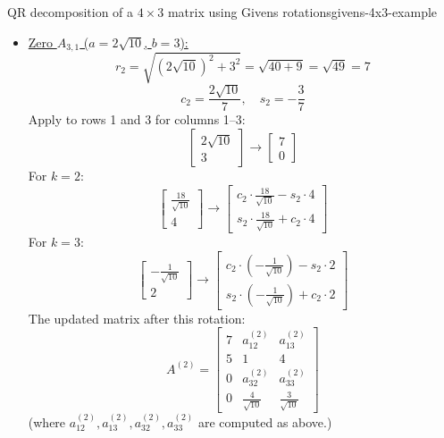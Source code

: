 \begin{example}{QR decomposition of a $4\times3$ matrix using Givens rotations}{givens-4x3-example}
\begin{itemize}
        \item \underline{Zero $A_{3,1}$ ($a=2\sqrt{10}$, $b=3$):}
        \[
            r_2 = \sqrt{(2\sqrt{10})^2 + 3^2} = \sqrt{40 + 9} = \sqrt{49} = 7
        \]
        \[
            c_2 = \frac{2\sqrt{10}}{7}, \quad s_2 = -\frac{3}{7}
        \]
        Apply to rows 1 and 3 for columns 1--3:
        \[
            \begin{bmatrix}
                2\sqrt{10} \\
                3
            \end{bmatrix}
            \to
            \begin{bmatrix}
                7 \\
                0
            \end{bmatrix}
        \]
        For $k=2$:
        \[
            \begin{bmatrix}
                \frac{18}{\sqrt{10}} \\
                4
            \end{bmatrix}
            \to
            \begin{bmatrix}
                c_2 \cdot \frac{18}{\sqrt{10}} - s_2 \cdot 4 \\
                s_2 \cdot \frac{18}{\sqrt{10}} + c_2 \cdot 4
            \end{bmatrix}
        \]
        For $k=3$:
        \[
            \begin{bmatrix}
                -\frac{1}{\sqrt{10}} \\
                2
            \end{bmatrix}
            \to
            \begin{bmatrix}
                c_2 \cdot \left(-\frac{1}{\sqrt{10}}\right) - s_2 \cdot 2 \\
                s_2 \cdot \left(-\frac{1}{\sqrt{10}}\right) + c_2 \cdot 2
            \end{bmatrix}
        \]
        The updated matrix after this rotation:
        \[
            A^{(2)} = \begin{bmatrix}
                7 & a_{12}^{(2)} & a_{13}^{(2)} \\
                5 & 1 & 4 \\
                0 & a_{32}^{(2)} & a_{33}^{(2)} \\
                0 & \frac{4}{\sqrt{10}} & \frac{3}{\sqrt{10}}
            \end{bmatrix}
        \]
        (where $a_{12}^{(2)}, a_{13}^{(2)}, a_{32}^{(2)}, a_{33}^{(2)}$ are computed as above.)


\end{itemize}
\end{example}
